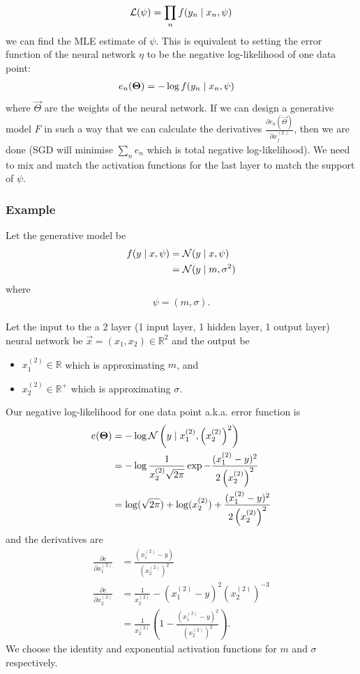 \begin{align}
    \mathcal L(\psi) = \prod_n f(y_n \mid x_n, \psi)
\end{align}
we can find the MLE estimate of $\psi$. This is equivalent to setting the error function of the neural network $\eta$ to be the negative log-likelihood of one data point:
\begin{align}
    e_n(\boldsymbol{\mathbf{\Theta}})    &= -\log f(y_n \mid x_n, \psi)
\end{align}
where $\vec \Theta$ are the weights of the neural network. If we can design a generative model $F$ in such a way that we can calculate the derivatives $\frac{\partial e_n(\vec \Theta)}{\partial x_j^{(L)}}$, then we are done (SGD will minimise $\sum_n e_n$ which is total negative log-likelihood). We need to mix and match the activation functions for the last layer to match the support of $\psi$.

\subsubsection{Example}
Let the generative model be
\begin{align}
    f(y \mid x, \psi) &= \operatorname{\mathcal N}(y \mid x, \psi) \\
                        &= \operatorname{\mathcal N}(y \mid m, \sigma^2)
\end{align}
where
\begin{align}
    \psi = (m, \sigma).
\end{align}

Let the input to the a 2 layer (1 input layer, 1 hidden layer, 1 output layer) neural network be $\vec x = (x_1, x_2) \in \mathbb R^2$ and the output be
\begin{itemize}
    \item $x_1^{(2)} \in \mathbb R$ which is approximating $m$, and
    \item $x_2^{(2)} \in \mathbb R^+$ which is approximating $\sigma$.
\end{itemize}

Our negative log-likelihood for one data point a.k.a. error function is
\begin{align}
    e(\boldsymbol{\mathbf{\Theta}})  &= -\log\operatorname{\mathcal N}\left(y \mid x_1^{(2)}, \left(x_2^{(2)}\right)^2\right) \\
                    &= -\log \frac{1}{x_2^{(2)} \sqrt{2\pi}} \exp{-\frac{(x_1^{(2)} - y)^2}{2\left(x_2^{(2)}\right)^2}} \\
                    &= \log(\sqrt{2\pi}) + \log(x_2^{(2)}) + \frac{(x_1^{(2)} - y)^2}{2\left(x_2^{(2)}\right)^2}
\end{align}
and the derivatives are
\begin{align}
    \frac{\partial e}{\partial x_1^{(2)}}  &= \frac{\left(x_1^{(2)} - y\right)}{\left(x_2^{(2)}\right)^2} \\
    \frac{\partial e}{\partial x_2^{(2)}}  &= \frac{1}{x_2^{(2)}} - \left(x_1^{(2)} - y\right)^2\left(x_2^{(2)}\right)^{-3} \\
                                    &= \frac{1}{x_2^{(2)}}\left(1 - \frac{(x_1^{(2)} - y)^2}{\left(x_2^{(2)}\right)^2}\right).
\end{align}
We choose the identity and exponential activation functions for $m$ and $\sigma$ respectively.